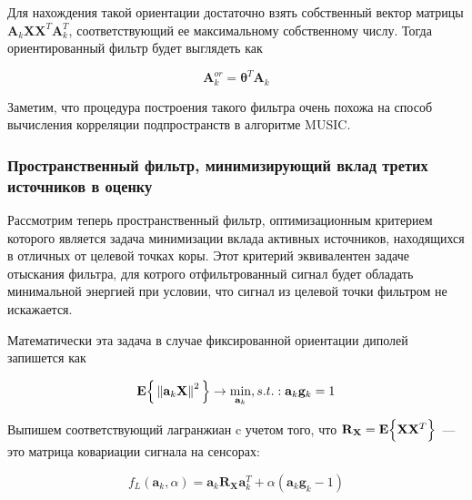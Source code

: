 Для нахождения такой ориентации достаточно взять собственный вектор матрицы
$\mathbf{A}_k \mathbf{X}\mathbf{X}^T \mathbf{A}_k^T$,
соответствующий ее максимальному собственному числу.
Тогда ориентированный фильтр будет выглядеть как

\begin{equation}
    \mathbf{A}_{k}^{or} = \boldsymbol{\theta}^T \mathbf{A}_k
\end{equation}

Заметим, что процедура построения такого фильтра очень похожа на способ
вычисления корреляции подпространств в алгоритме MUSIC\@.

\subsubsection{Пространственный фильтр, минимизирующий вклад третих источников в оценку}

Рассмотрим теперь пространственный фильтр,
оптимизационным критерием которого является задача минимизации
вклада активных источников, находящихся в отличных от целевой точках коры.
Этот критерий эквивалентен задаче отыскания фильтра, для котрого отфильтрованный
сигнал будет обладать минимальной энергией при условии, что
сигнал из целевой точки фильтром не искажается.

Математически эта задача в случае фиксированной ориентации диполей запишется как

\begin{equation}
    \mathbf{E}\Big\{\left\lVert\mathbf{a}_k \mathbf{X}\right\rVert^2\Big\}
    \rightarrow \underset{\mathbf{a}_k}{\min},
    s.t.: \mathbf{a}_k \mathbf{g}_k = 1
    \label{lcmv_objective_nonreg}
\end{equation}

Выпишем соответствующий лагранжиан c учетом того,
что $\mathbf{R}_{\mathbf{X}} = \mathbf{E}\Big\{\mathbf{X}\mathbf{X}^T\Big\}$~---
это матрица ковариации сигнала на сенсорах:

\begin{equation}
    f_L(\mathbf{a}_k, \alpha) = \mathbf{a}_k \mathbf{R}_{\mathbf{X}} \mathbf{a}_k^T +
                                 \alpha (\mathbf{a}_k \mathbf{g}_k - 1)
\end{equation}


